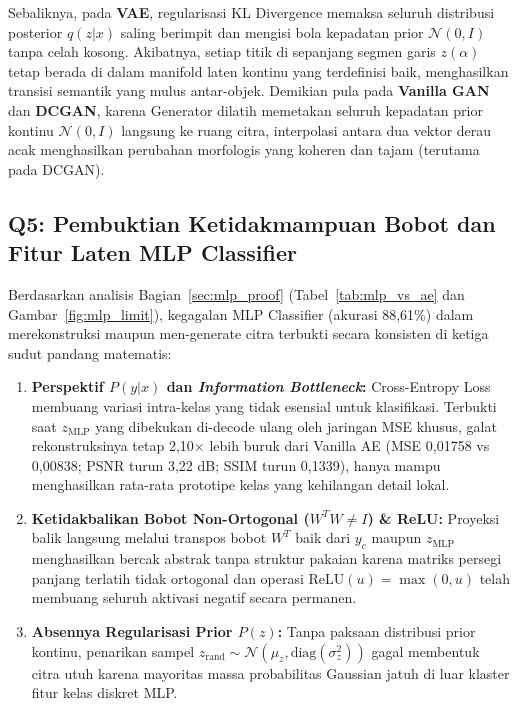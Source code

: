 \documentclass[11pt,a4paper]{article}
\begin{document}
Sebaliknya, pada \textbf{VAE}, regularisasi KL Divergence memaksa seluruh distribusi posterior $q(z|x)$ saling berimpit dan mengisi bola kepadatan prior $\mathcal{N}(0, I)$ tanpa celah kosong. Akibatnya, setiap titik di sepanjang segmen garis $z(\alpha)$ tetap berada di dalam manifold laten kontinu yang terdefinisi baik, menghasilkan transisi semantik yang mulus antar-objek. Demikian pula pada \textbf{Vanilla GAN} dan \textbf{DCGAN}, karena Generator dilatih memetakan seluruh kepadatan prior kontinu $\mathcal{N}(0, I)$ langsung ke ruang citra, interpolasi antara dua vektor derau acak menghasilkan perubahan morfologis yang koheren dan tajam (terutama pada DCGAN).

\subsection{Q5: Pembuktian Ketidakmampuan Bobot dan Fitur Laten MLP Classifier}
Berdasarkan analisis Bagian~\ref{sec:mlp_proof} (Tabel~\ref{tab:mlp_vs_ae} dan Gambar~\ref{fig:mlp_limit}), kegagalan MLP Classifier (akurasi 88,61\%) dalam merekonstruksi maupun men-generate citra terbukti secara konsisten di ketiga sudut pandang matematis:
\begin{enumerate}[leftmargin=1.4em, itemsep=2pt]
  \item \textbf{Perspektif $P(y|x)$ dan \textit{Information Bottleneck}:} Cross-Entropy Loss membuang variasi intra-kelas yang tidak esensial untuk klasifikasi. Terbukti saat $z_{\text{MLP}}$ yang dibekukan di-decode ulang oleh jaringan MSE khusus, galat rekonstruksinya tetap 2,10$\times$ lebih buruk dari Vanilla AE (MSE 0,01758 vs 0,00838; PSNR turun 3,22 dB; SSIM turun 0,1339), hanya mampu menghasilkan rata-rata prototipe kelas yang kehilangan detail lokal.
  \item \textbf{Ketidakbalikan Bobot Non-Ortogonal ($W^T W \neq I$) \& ReLU:} Proyeksi balik langsung melalui transpos bobot $W^T$ baik dari $y_c$ maupun $z_{\text{MLP}}$ menghasilkan bercak abstrak tanpa struktur pakaian karena matriks persegi panjang terlatih tidak ortogonal dan operasi $\text{ReLU}(u) = \max(0, u)$ telah membuang seluruh aktivasi negatif secara permanen.
  \item \textbf{Absennya Regularisasi Prior $P(z)$:} Tanpa paksaan distribusi prior kontinu, penarikan sampel $z_{\text{rand}} \sim \mathcal{N}(\mu_z, \text{diag}(\sigma_z^2))$ gagal membentuk citra utuh karena mayoritas massa probabilitas Gaussian jatuh di luar klaster fitur kelas diskret MLP.
\end{enumerate}
\end{document}
